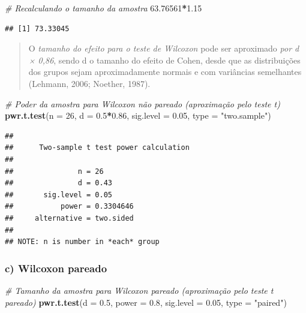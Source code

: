 \documentclass[
]{book}
\newenvironment{Shaded}{\begin{snugshade}}{\end{snugshade}}
\newcommand{\AttributeTok}[1]{\textcolor[rgb]{0.13,0.29,0.53}{#1}}
\newcommand{\CommentTok}[1]{\textcolor[rgb]{0.56,0.35,0.01}{\textit{#1}}}
\newcommand{\DecValTok}[1]{\textcolor[rgb]{0.00,0.00,0.81}{#1}}
\newcommand{\FloatTok}[1]{\textcolor[rgb]{0.00,0.00,0.81}{#1}}
\newcommand{\FunctionTok}[1]{\textcolor[rgb]{0.13,0.29,0.53}{\textbf{#1}}}
\newcommand{\NormalTok}[1]{#1}
\newcommand{\SpecialCharTok}[1]{\textcolor[rgb]{0.81,0.36,0.00}{\textbf{#1}}}
\newcommand{\StringTok}[1]{\textcolor[rgb]{0.31,0.60,0.02}{#1}}
\begin{document}
\begin{Shaded}
\begin{Highlighting}[]
\CommentTok{\# Recalculando o tamanho da amostra}
\FloatTok{63.76561}\SpecialCharTok{*}\FloatTok{1.15}
\end{Highlighting}
\end{Shaded}

\begin{verbatim}
## [1] 73.33045
\end{verbatim}

\begin{quote}
O \emph{tamanho do efeito para o teste de Wilcoxon} pode ser aproximado \emph{por d × 0,86}, sendo d o tamanho do efeito de Cohen, desde que as distribuições dos grupos sejam aproximadamente normais e com variâncias semelhantes (Lehmann, 2006; Noether, 1987).
\end{quote}

\begin{Shaded}
\begin{Highlighting}[]
\CommentTok{\# Poder da amostra para Wilcoxon não pareado (aproximação pelo teste t)}
\FunctionTok{pwr.t.test}\NormalTok{(}\AttributeTok{n =} \DecValTok{26}\NormalTok{, }\AttributeTok{d =} \FloatTok{0.5}\SpecialCharTok{*}\FloatTok{0.86}\NormalTok{, }\AttributeTok{sig.level =} \FloatTok{0.05}\NormalTok{, }\AttributeTok{type =} \StringTok{"two.sample"}\NormalTok{)}
\end{Highlighting}
\end{Shaded}

\begin{verbatim}
## 
##      Two-sample t test power calculation 
## 
##               n = 26
##               d = 0.43
##       sig.level = 0.05
##           power = 0.3304646
##     alternative = two.sided
## 
## NOTE: n is number in *each* group
\end{verbatim}

\subsubsection{c) Wilcoxon pareado}\label{c-wilcoxon-pareado}

\begin{Shaded}
\begin{Highlighting}[]
\CommentTok{\# Tamanho da amostra para Wilcoxon pareado (aproximação pelo teste t pareado)}
\FunctionTok{pwr.t.test}\NormalTok{(}\AttributeTok{d =} \FloatTok{0.5}\NormalTok{, }\AttributeTok{power =} \FloatTok{0.8}\NormalTok{, }\AttributeTok{sig.level =} \FloatTok{0.05}\NormalTok{, }\AttributeTok{type =} \StringTok{"paired"}\NormalTok{)}
\end{Highlighting}
\end{Shaded}
\end{document}
